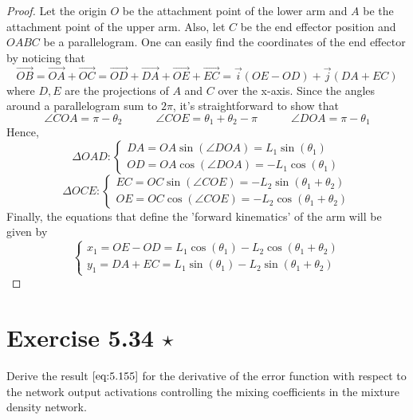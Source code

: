 \begin{proof}
    Let the origin $O$ be the attachment point of the lower arm 
    and $A$ be the attachment point of the upper arm. Also,
    let $C$ be the end effector position and $OABC$ be a parallelogram.
    One can easily find the coordinates of the end effector by noticing that
    \[
        \overrightarrow{OB} 
        = \overrightarrow{OA} + \overrightarrow{OC}
        = \overrightarrow{OD} + \overrightarrow{DA} + 
        \overrightarrow{OE} + \overrightarrow{EC} 
        = \overrightarrow{i}(OE - OD) + \overrightarrow{j}(DA + EC) 

    \] 
    where $D, E$ are the projections of $A$ and $C$ over the x-axis.
    Since the angles around a parallelogram sum to $2\pi$, it's straightforward
    to show that
    \[
        \angle{COA} = \pi - \theta_2
        \hspace{3em}
        \angle{COE} = \theta_1 + \theta_2 - \pi
        \hspace{3em}
        \angle{DOA} = \pi - \theta_1
    \] 
    Hence,
    \[
        \Delta OAD:
        \begin{cases}
            DA = OA\sin(\angle DOA) = L_1 \sin(\theta_1) \\
            OD = OA\cos(\angle DOA) = -L_1 \cos(\theta_1)
        \end{cases}
    \]
    \[
        \Delta OCE:
        \begin{cases}
            EC = OC\sin(\angle COE) = -L_2 \sin(\theta_1 + \theta_2) \\
            OE = OC\cos(\angle COE) = -L_2 \cos(\theta_1 + \theta_2)
        \end{cases}
    \] 
    Finally, the equations that define the 'forward kinematics' of
    the arm will be given by
    \[
        \begin{cases}
            x_1 = OE - OD = L_1 \cos(\theta_1) - L_2 \cos(\theta_1 + \theta_2) \\
            y_1 = DA + EC = L_1\sin(\theta_1) - L_2 \sin(\theta_1 + \theta_2)
        \end{cases}
    \] 
\end{proof}

\section*{Exercise 5.34 $\star$}
Derive the result $\eqref{eq:5.155}$ for the derivative
of the error function with respect to the network output 
activations controlling the mixing coefficients in the mixture
density network.

